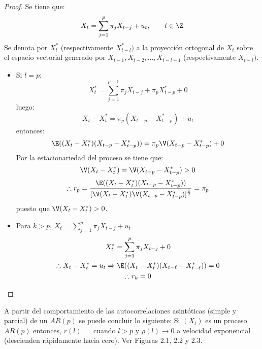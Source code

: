 \begin{proof}
Se tiene que:
\[
X_{t} =\sum_{j=1}^p {\pi_{j} X_{t-j} +u_{t} } ,
\qquad
t\in \Z
\]
Se denota por $X_{t}^{\ast } $ (respectivamente $X_{t-l}^{\ast })$ a la proyecci\'{o}n ortogonal de $X_{t}$ sobre el espacio vectorial generado por $X_{t-1}, X_{t-2},\ldots, X_{t-l+1}$ (respectivamente $X_{t-l})$.

\begin{itemize}
\item Si $l=p$: 
\[
X_{t}^{\ast } =\sum_{j=1}^{p-1} {\pi_{j} X_{t-j} +\pi_{p} 
X_{t-p}^{\ast } +0} 
\]
luego: 
\[
X_{t} -X_{t}^{\ast } =\pi_{p} (X_{t-p} -X_{t-p}^{\ast } )+u_{t} 
\]
entonces: 
\[
\E((X_{t} -X_{t}^{\ast } )(X_{t-p} -X_{t-p}^{\ast } ))=\pi_{p} \V(X_{t-p} 
-X_{t-p}^{\ast } )+0
\]
Por la estacionariedad del proceso se tiene que:
\[
\V(X_{t} -X_{t}^{\ast } )=\V(X_{t-p} -X_{t-p}^{\ast } )>0
\]
\[
\therefore r_{p} =\frac{\E((X_{t} -X_{t}^{\ast } )(X_{t-p} -X_{t-p}^{\ast } 
))}{[\V(X_{t} -X_{t}^{\ast } )\V(X_{t-p} -X_{t-p}^{\ast } 
)]^{\frac{1}{2}}}=\pi_{p} 
\]
puesto que $\V(X_{t} -X_{t}^{\ast } )>0$.

\item Para $k>p$, $X_{t} =\sum_{j=1}^p {\pi_{j} X_{t-j} +u_{t} } $
\begin{gather*}
X_{t}^{\ast } =\sum_{j=1}^p {\pi_{j} X_{t-j} } +0\\
\therefore X_{t} -X_{t}^{\ast } =u_{t} \Rightarrow \E((X_{t} -X_{t}^{\ast } )(X_{t-\ell } -X_{t-\ell }^{\ast } ))=0\\
\therefore r_{k} =0\qedhere
\end{gather*}
\end{itemize}
\end{proof}

\begin{observacion} A partir del comportamiento de las autocorrelaciones asint\'{o}ticas (simple y parcial) de un $AR(p)$ se puede concluir lo siguiente: Si $(X_{t})$ es un proceso $AR(p)$ entonces, $r(l)=$ cuando $l>p$ y $\rho (l)\to 0$ a velocidad exponencial (descienden r\'{a}pidamente hacia cero). Ver Figuras 2.1, 2.2 y 
2.3.
\end{observacion}





